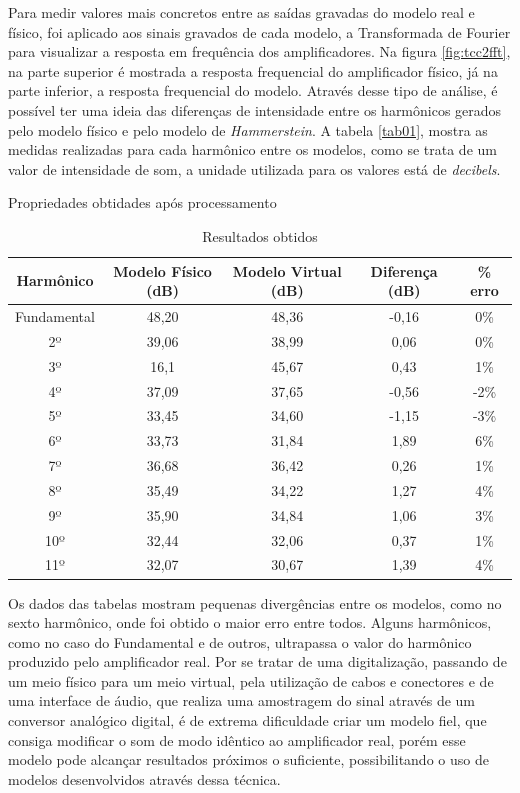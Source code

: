 Para medir valores mais concretos entre as saídas gravadas do modelo real e físico, foi aplicado aos sinais gravados de cada modelo, a Transformada de Fourier para visualizar a resposta em frequência dos amplificadores. Na figura \ref{fig:tcc2fft}, na parte superior é mostrada a resposta frequencial do amplificador físico, já na parte inferior, a resposta frequencial do modelo. Através desse tipo de análise, é possível ter uma ideia das diferenças de intensidade entre os harmônicos gerados pelo modelo físico e pelo modelo de \textit{Hammerstein}. A tabela \ref{tab01}, mostra as medidas realizadas para cada harmônico entre os modelos, como se trata de um valor de intensidade de som, a unidade utilizada para os valores está de \textit{decibels}.
\begin{table}[h]
	\centering
	\caption{Propriedades obtidades após processamento}
	\label{tab01}
	
	\begin{tabular}{ccccc}
		\toprule
		\textbf{Harmônico} & \textbf{Modelo Físico (dB)} & \textbf{Modelo Virtual (dB)} & \textbf{Diferença (dB)} & \textbf{\% erro}  \\
		\midrule
		Fundamental & 48,20 & 48,36 & -0,16 & 0\% \\
		2º & 39,06 & 38,99 & 0,06 & 0\%  \\
		3º & 16,1 & 45,67 & 0,43 & 1\% 	\\
		4º & 37,09 & 37,65 & -0,56 & -2\% \\
		5º & 33,45 & 34,60 & -1,15 & -3\% \\ 
		6º & 33,73 & 31,84 & 1,89 & 6\%   \\ 
		7º & 36,68 & 36,42 & 0,26 & 1\%   \\ 
		8º & 35,49 & 34,22 & 1,27 & 4\%   \\ 
		9º & 35,90 & 34,84 & 1,06 & 3\%   \\ 
		10º & 32,44 & 32,06 & 0,37 & 1\%  \\ 
		11º & 32,07 & 30,67 & 1,39 & 4\%  \\
		\bottomrule
	\end{tabular}
	\label{Resultados obtidos}
	\caption{Resultados obtidos}
\end{table}

Os dados das tabelas mostram pequenas divergências entre os modelos, como no sexto harmônico, onde foi obtido o maior erro entre todos. Alguns harmônicos, como no caso do Fundamental e de outros, ultrapassa o valor do harmônico produzido pelo amplificador real. Por se tratar de uma digitalização, passando de um meio físico para um meio virtual, pela utilização de cabos e conectores e de uma interface de áudio, que realiza uma amostragem do sinal através de um conversor analógico digital, é de extrema dificuldade criar um modelo fiel, que consiga modificar o som de modo idêntico ao amplificador real, porém esse modelo pode alcançar resultados próximos o suficiente, possibilitando o uso de modelos desenvolvidos através dessa técnica.



